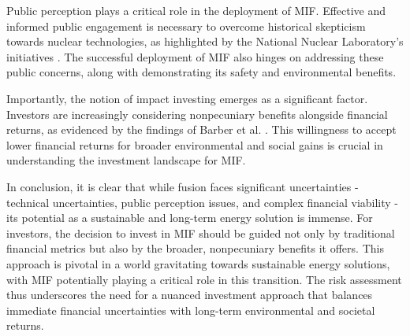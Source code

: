 Public perception plays a critical role in the deployment of MIF. Effective and informed public engagement is necessary to overcome historical skepticism towards nuclear technologies, as highlighted by the National Nuclear Laboratory’s initiatives \cite{tol2022costs}. The successful deployment of MIF also hinges on addressing these public concerns, along with demonstrating its safety and environmental benefits.

Importantly, the notion of impact investing emerges as a significant factor. Investors are increasingly considering nonpecuniary benefits alongside financial returns, as evidenced by the findings of Barber et al. \cite{barber2021impact}. This willingness to accept lower financial returns for broader environmental and social gains is crucial in understanding the investment landscape for MIF.

In conclusion, it is clear that while fusion faces significant uncertainties - technical uncertainties, public perception issues, and complex financial viability - its potential as a sustainable and long-term energy solution is immense. For investors, the decision to invest in MIF should be guided not only by traditional financial metrics but also by the broader, nonpecuniary benefits it offers. This approach is pivotal in a world gravitating towards sustainable energy solutions, with MIF potentially playing a critical role in this transition. The risk assessment thus underscores the need for a nuanced investment approach that balances immediate financial uncertainties with long-term environmental and societal returns.